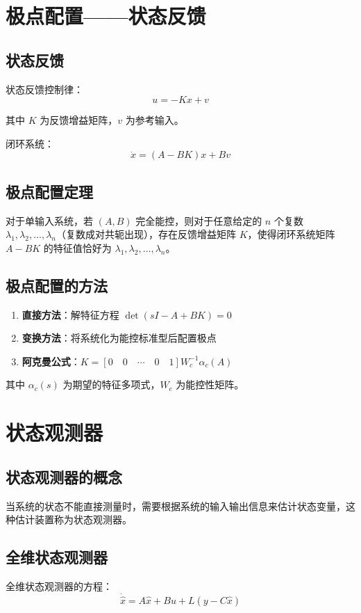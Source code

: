 \documentclass[12pt,a4paper]{article}
\begin{document}
\section{极点配置——状态反馈}

\subsection{状态反馈}
状态反馈控制律：
\[u = -Kx + v\]

其中 $K$ 为反馈增益矩阵，$v$ 为参考输入。

闭环系统：
\[\dot{x} = (A - BK)x + Bv\]

\subsection{极点配置定理}
对于单输入系统，若 $(A, B)$ 完全能控，则对于任意给定的 $n$ 个复数 $\lambda_1, \lambda_2, \ldots, \lambda_n$（复数成对共轭出现），存在反馈增益矩阵 $K$，使得闭环系统矩阵 $A - BK$ 的特征值恰好为 $\lambda_1, \lambda_2, \ldots, \lambda_n$。

\subsection{极点配置的方法}
\begin{enumerate}
    \item \textbf{直接方法}：解特征方程 $\det(sI - A + BK) = 0$
    \item \textbf{变换方法}：将系统化为能控标准型后配置极点
    \item \textbf{阿克曼公式}：$K = [0 \quad 0 \quad \cdots \quad 0 \quad 1] W_c^{-1} \alpha_c(A)$
\end{enumerate}

其中 $\alpha_c(s)$ 为期望的特征多项式，$W_c$ 为能控性矩阵。

\section{状态观测器}

\subsection{状态观测器的概念}
当系统的状态不能直接测量时，需要根据系统的输入输出信息来估计状态变量，这种估计装置称为状态观测器。

\subsection{全维状态观测器}
全维状态观测器的方程：
\[\dot{\hat{x}} = A\hat{x} + Bu + L(y - C\hat{x})\]
\end{document}
